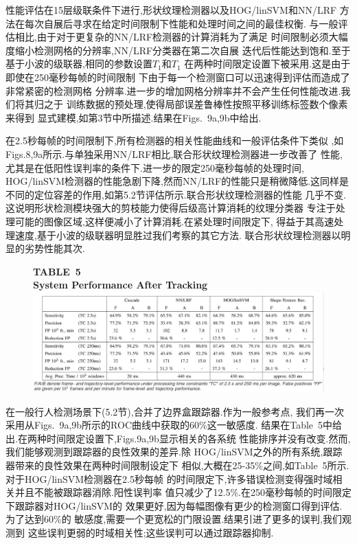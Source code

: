 \documentclass[10pt,letterpaper,journal,compsoc]{IEEEtran}
\begin{document}
性能评估在15层级联条件下进行,形状纹理检测器以及HOG/linSVM和NN/LRF
方法在每次自展后寻求在给定时间限制下性能和处理时间之间的最佳权衡.
与一般评估相比,由于对于更复杂的NN/LRF检测器的计算消耗为了满足
时间限制必须大幅度缩小检测网格的分辨率,NN/LRF分类器在第二次自展
迭代后性能达到饱和.至于基于小波的级联器,相同的参数设置$T_1$和$T_1$
在两种时间限定设置下被采用.这是由于即使在250毫秒每帧的时间限制
下由于每一个检测窗口可以迅速得到评估而造成了非常紧密的检测网格
分辨率.进一步的增加网格分辨率并不会产生任何性能改进.我们将其归之于
训练数据的预处理,使得局部误差鲁棒性按照平移训练标签数个像素来得到
显式建模,如第3节中所描述.结果在Figs.~9a,9b中给出.

在2.5秒每帧的时间限制下,所有检测器的相关性能曲线和一般评估条件下类似
,如Figs.8,9a所示.与单独采用NN/LRF相比,联合形状纹理检测器进一步改善了
性能,尤其是在低阳性误判率的条件下.进一步的限定250毫秒每帧的处理时间,
HOG/linSVM检测器的性能急剧下降,然而NN/LRF的性能只是稍微降低.这同样是
不同的定位容差的作用,如第5.2节评估所示.联合形状纹理检测器的性能
几乎不变.这说明形状检测模块强大的剪枝能力使得后级高计算消耗的纹理分类器
专注于处理可能的图像区域,这样便减小了计算消耗.在紧处理时间限定下,
得益于其高速处理速度,基于小波的级联器明显胜过我们考察的其它方法.
联合形状纹理检测器以明显的劣势性能其次.

\begin{figure}[!t]
\centering
\large{\textbf{TABLE~5\\
System Performance After Tracking
}}
\includegraphics[width=7in]{table5.JPG}
\end{figure}
在一般行人检测场景下(5.2节),合并了边界盒跟踪器.作为一般参考点,
我们再一次采用从Figs.~9a,9b所示的ROC曲线中获取的60\%这一敏感度.
结果在Table~5中给出.在两种时间限定设置下,Figs.9a,9b显示相关的各系统
性能排序并没有改变.然而,我们能够观测到跟踪器的良性效果的差异.除
HOG/linSVM之外的所有系统,跟踪器带来的良性效果在两种时间限制设定下
相似,大概在25-35\%之间,如Table~5所示.对于HOG/linSVM检测器在2.5秒每帧
的时间限定下,许多错误检测变得强时域相关并且不能被跟踪器消除.阳性误判率
值只减少了12.5\%.在250毫秒每帧的时间限定下跟踪器对HOG/linSVM的
效果更好,因为每幅图像有更少的检测窗口得到评估.为了达到60\%的
敏感度,需要一个更宽松的门限设置.结果引进了更多的误判,我们观测到
这些误判更弱的时域相关性;这些误判可以通过跟踪器抑制.
\end{document}
